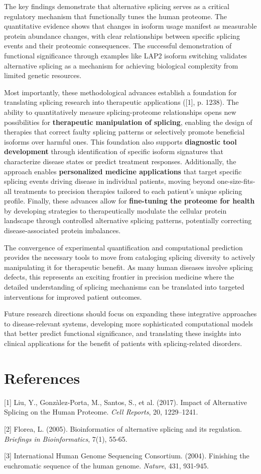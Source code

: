 \documentclass[12pt,a4paper]{article}
\begin{document}
The key findings demonstrate that alternative splicing serves as a critical regulatory mechanism that functionally tunes the human proteome. The quantitative evidence shows that changes in isoform usage manifest as measurable protein abundance changes, with clear relationships between specific splicing events and their proteomic consequences. The successful demonstration of functional significance through examples like LAP2 isoform switching validates alternative splicing as a mechanism for achieving biological complexity from limited genetic resources.

Most importantly, these methodological advances establish a foundation for translating splicing research into therapeutic applications ([1], p. 1238). The ability to quantitatively measure splicing-proteome relationships opens new possibilities for \textbf{therapeutic manipulation of splicing}, enabling the design of therapies that correct faulty splicing patterns or selectively promote beneficial isoforms over harmful ones. This foundation also supports \textbf{diagnostic tool development} through identification of specific isoform signatures that characterize disease states or predict treatment responses. Additionally, the approach enables \textbf{personalized medicine applications} that target specific splicing events driving disease in individual patients, moving beyond one-size-fits-all treatments to precision therapies tailored to each patient's unique splicing profile. Finally, these advances allow for \textbf{fine-tuning the proteome for health} by developing strategies to therapeutically modulate the cellular protein landscape through controlled alternative splicing patterns, potentially correcting disease-associated protein imbalances.

The convergence of experimental quantification and computational prediction provides the necessary tools to move from cataloging splicing diversity to actively manipulating it for therapeutic benefit. As many human diseases involve splicing defects, this represents an exciting frontier in precision medicine where the detailed understanding of splicing mechanisms can be translated into targeted interventions for improved patient outcomes.

Future research directions should focus on expanding these integrative approaches to disease-relevant systems, developing more sophisticated computational models that better predict functional significance, and translating these insights into clinical applications for the benefit of patients with splicing-related disorders.

\section{References}

[1] Liu, Y., Gonzàlez-Porta, M., Santos, S., et al. (2017). Impact of Alternative Splicing on the Human Proteome. \textit{Cell Reports}, 20, 1229–1241.

[2] Florea, L. (2005). Bioinformatics of alternative splicing and its regulation. \textit{Briefings in Bioinformatics}, 7(1), 55-65.

[3] International Human Genome Sequencing Consortium. (2004). Finishing the euchromatic sequence of the human genome. \textit{Nature}, 431, 931-945.
\end{document}
